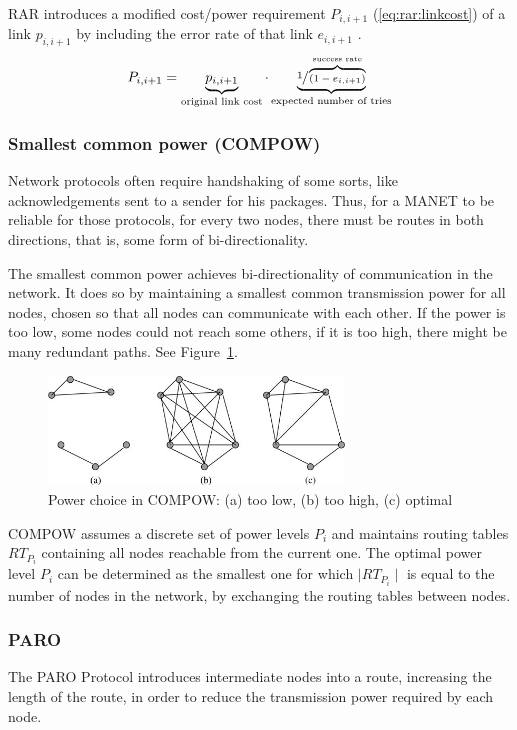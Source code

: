 RAR\cite{banerjee2002minimum} introduces a modified cost/power requirement
$P_{i,i+1}$ (\ref{eq:rar:linkcost}) of a link $p_{i,i+1}$ by including the error
rate of that link $e_{i,i+1}$ .
\begin{align}\label{eq:rar:linkcost}
  P_{i,i+1} = \underbrace{p_{i,i+1}}_{\text{original link cost}} \cdot \underbrace{\sfrac{1}{\overbrace{(1-e_{i,i+1})}^{\text{success rate}}}}_{\text{expected number of tries}}
\end{align} 

\subsubsection{Smallest common power (COMPOW)}
Network protocols often require handshaking of some sorts, like acknowledgements
sent to a sender for his packages. Thus, for a MANET to be reliable for those
protocols, for every two nodes, there must be routes in both directions, that
is, some form of bi-directionality.

The smallest common power\cite{narayanaswamy2002power} achieves bi-directionality
of communication in the network.
It does so by maintaining a smallest common transmission power for all nodes,
chosen so that all nodes can communicate with each other. If the power is too
low, some nodes could not reach some others, if it is too high, there might be
many redundant paths. See Figure~\ref{compow:power-choice}.


\begin{figure}
\centering
\includegraphics[width=0.7\textwidth]{images/compow-level-choice}
\caption{Power choice in COMPOW: (a) too low, (b) too high, (c) optimal}
\label{compow:power-choice}
\end{figure}

COMPOW assumes a discrete set of power levels $P_{i}$ and maintains routing
tables ${RT}_{P_{i}}$ containing all nodes reachable from the current one. The
optimal power level $P_{i}$ can be determined as the smallest one for which
$\mid RT_{P_{i}} \mid$ is equal to the number of nodes in the network, by
exchanging the routing tables between nodes.

\subsubsection{PARO}
The PARO Protocol\cite{gomez2003paro} introduces intermediate nodes into a
route, increasing the length of the route, in order to reduce the transmission
power required by each node.
